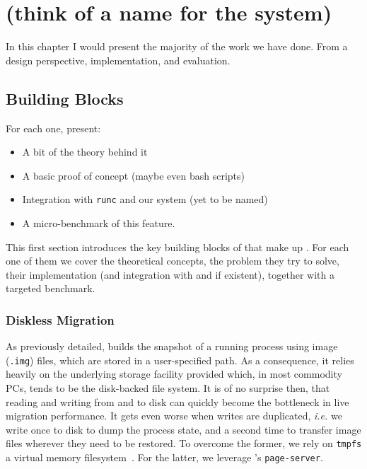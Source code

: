 \chapter{\projName (think of a name for the system)} \label{chap:system}

In this chapter I would present the majority of the work we have done.
From a design perspective, implementation, and evaluation.

\section{Building Blocks}

For each one, present:
\begin{itemize}
    \item A bit of the theory behind it
    \item A basic proof of concept (maybe even bash scripts)
    \item Integration with \texttt{runc} and our system (yet to be named)
    \item A micro-benchmark of this feature.
\end{itemize}

This first section introduces the key building blocks of that make up \projName.
For each one of them we cover the theoretical concepts, the problem they try to solve, their implementation (and integration with \criu and \runc if existent), together with a targeted benchmark.



\subsection{Diskless Migration}

As previously detailed, \criu builds the snapshot of a running process using image (\texttt{.img}) files, which are stored in a user-specified path.
As a consequence, it relies heavily on the underlying storage facility provided which, in most commodity PCs, tends to be the disk-backed file system.
It is of no surprise then, that reading and writing from and to disk can quickly become the bottleneck in live migration performance.
It gets even worse when writes are duplicated, \textit{i.e.} we write once to disk to dump the process state, and a second time to transfer image files wherever they need to be restored.
To overcome the former, we rely on \texttt{tmpfs} a virtual memory filesystem~\cite{tmpfs-manpage}.
For the latter, we leverage \criu's \texttt{page-server}.

